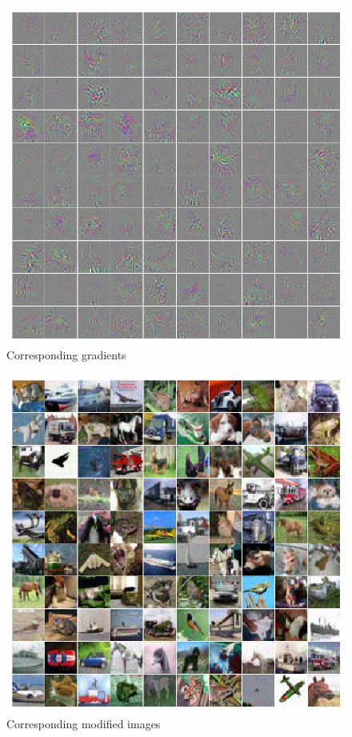 \documentclass[15pt]{article}
\begin{document}
\begin{figure}[H]
\centering
\includegraphics[width=\textwidth]{../Visualization/gradient_image}
\caption{Corresponding gradients}
\end{figure}

\begin{figure}[H]
\centering
\includegraphics[width=\textwidth]{../Visualization/jittered_images}
\caption{Corresponding modified images}
\end{figure}
\end{document}
